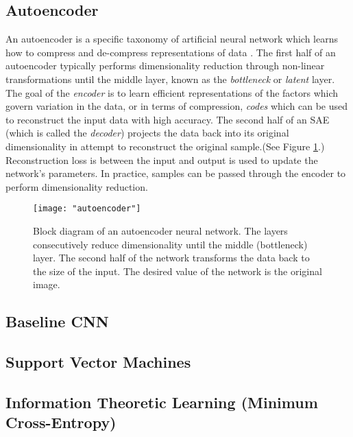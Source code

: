 \documentclass[conference]{IEEEtran}
\begin{document}
	 \subsection{Autoencoder} An autoencoder is a specific taxonomy of artificial neural network which learns how to  compress and de-compress representations of data \cite{Haykin2009NeuralNetworks,Goodfellow2016DeepLearning}. The first half of an autoencoder typically performs dimensionality reduction through non-linear transformations until the middle layer, known as the \textit{bottleneck} or \textit{latent} layer.  The goal of the \textit{encoder} is to learn efficient representations of the factors which govern variation in the data, or in terms of compression, \textit{codes} which can be used to reconstruct the input  data with high accuracy. The second half of an SAE (which is called the \textit{decoder}) projects the data back into its original dimensionality in attempt to reconstruct the original sample.(See Figure \ref{fig:autoencoder}.) Reconstruction loss is between the input and output is used to update the network's parameters.  In practice, samples can be passed through the encoder to perform dimensionality reduction. 
	 
	 
	 \begin{center}
	  	\begin{figure}[t]
	  		\centering
	  		\texttt{[image: "autoencoder"]}
	  		\caption{Block diagram of an autoencoder neural network.  The layers consecutively reduce dimensionality until the middle (bottleneck) layer.  The second half of the network transforms the data back to the size of the input.  The desired value of the network is the original image.}
	  		\label{fig:autoencoder}
	  	\end{figure}
	  \end{center}
	 
	 
	 \subsection{Baseline CNN}
	 
	 \subsection{Support Vector Machines}
	 
	 \subsection{Information Theoretic Learning (Minimum Cross-Entropy)}
	 
\end{document}
